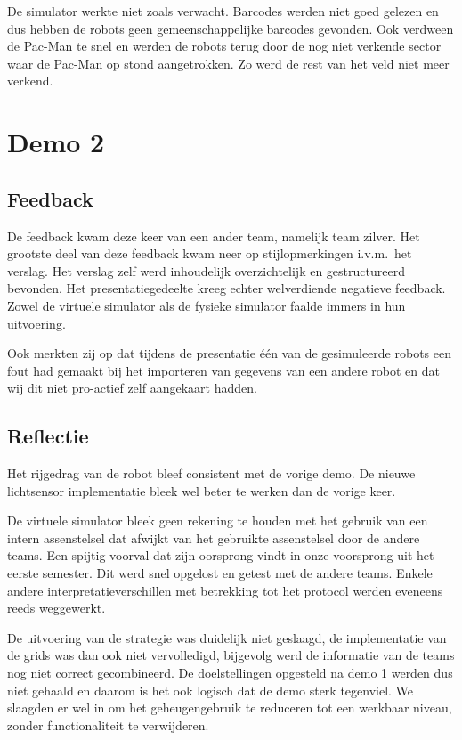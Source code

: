 \documentclass[12pt,a4paper]{report}
\begin{document}
De simulator werkte niet zoals verwacht. Barcodes werden niet goed gelezen en dus hebben de robots geen gemeenschappelijke barcodes gevonden. Ook verdween de Pac-Man te snel en werden de robots terug door de nog niet verkende sector waar de Pac-Man op stond aangetrokken. Zo werd de rest van het veld niet meer verkend.

\section{Demo 2}

\subsection{Feedback}

De feedback kwam deze keer van een ander team, namelijk team zilver. Het grootste deel van deze feedback kwam neer op stijlopmerkingen i.v.m.\ het verslag. Het verslag zelf werd inhoudelijk overzichtelijk en gestructureerd bevonden. Het presentatiegedeelte kreeg echter welverdiende negatieve feedback. Zowel de virtuele simulator als de fysieke simulator faalde immers in hun uitvoering.

Ook merkten zij op dat tijdens de presentatie \'e\'en van de gesimuleerde robots een fout had gemaakt bij het importeren van gegevens van een andere robot en dat wij dit niet pro-actief zelf aangekaart hadden. 

\subsection{Reflectie}

Het rijgedrag van de robot bleef consistent met de vorige demo. De nieuwe lichtsensor implementatie bleek wel beter te werken dan de vorige keer.

De virtuele simulator bleek geen rekening te houden met het gebruik van een intern assenstelsel dat afwijkt van het gebruikte assenstelsel door de andere teams. Een spijtig voorval dat zijn oorsprong vindt in onze voorsprong uit het eerste semester. Dit werd snel opgelost en getest met de andere teams. Enkele andere interpretatieverschillen met betrekking tot het protocol werden eveneens reeds weggewerkt.

De uitvoering van de strategie was duidelijk niet geslaagd, de implementatie van de grids was dan ook niet vervolledigd, bijgevolg werd de informatie van de teams nog niet correct gecombineerd.
De doelstellingen opgesteld na demo 1 werden dus niet gehaald en daarom is het ook logisch dat de demo sterk tegenviel. We slaagden er wel in om het geheugengebruik te reduceren tot een werkbaar niveau, zonder functionaliteit te verwijderen.
\end{document}
